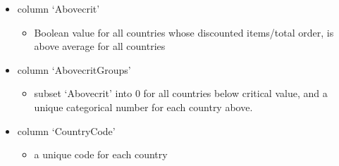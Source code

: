 \documentclass[11pt]{article}
\providecommand{\tightlist}{%
      \setlength{\itemsep}{0pt}\setlength{\parskip}{0pt}}
\begin{document}
\begin{itemize}
\tightlist
\item
  column `Abovecrit'

  \begin{itemize}
  \tightlist
  \item
    Boolean value for all countries whose discounted items/total order,
    is above average for all countries
  \end{itemize}
\item
  column `AbovecritGroups'

  \begin{itemize}
  \tightlist
  \item
    subset `Abovecrit' into 0 for all countries below critical value,
    and a unique categorical number for each country above.
  \end{itemize}
\item
  column `CountryCode'

  \begin{itemize}
  \tightlist
  \item
    a unique code for each country
  \end{itemize}
\end{itemize}
\end{document}
